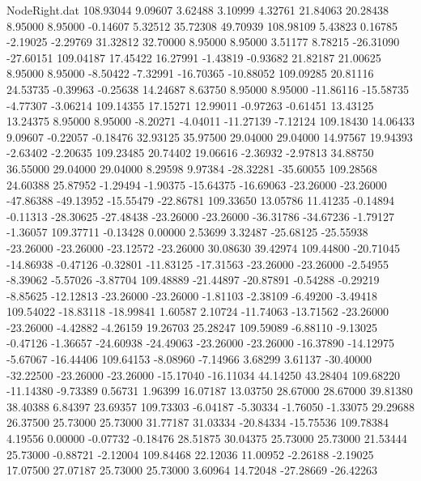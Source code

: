 \begin{filecontents}{NodeRight.dat}
 108.93044    9.09607    3.62488     3.10999    4.32761   21.84063   20.28438    8.95000    8.95000   -0.14607    5.32512   35.72308   49.70939
 108.98109    5.43823    0.16785    -2.19025   -2.29769   31.32812   32.70000    8.95000    8.95000    3.51177    8.78215  -26.31090  -27.60151
 109.04187   17.45422   16.27991    -1.43819   -0.93682   21.82187   21.00625    8.95000    8.95000   -8.50422   -7.32991  -16.70365  -10.88052
 109.09285   20.81116   24.53735    -0.39963   -0.25638   14.24687    8.63750    8.95000    8.95000  -11.86116  -15.58735   -4.77307   -3.06214
 109.14355   17.15271   12.99011    -0.97263   -0.61451   13.43125   13.24375    8.95000    8.95000   -8.20271   -4.04011  -11.27139   -7.12124
 109.18430   14.06433    9.09607    -0.22057   -0.18476   32.93125   35.97500   29.04000   29.04000   14.97567   19.94393   -2.63402   -2.20635
 109.23485   20.74402   19.06616    -2.36932   -2.97813   34.88750   36.55000   29.04000   29.04000    8.29598    9.97384  -28.32281  -35.60055
 109.28568   24.60388   25.87952    -1.29494   -1.90375  -15.64375  -16.69063  -23.26000  -23.26000  -47.86388  -49.13952  -15.55479  -22.86781
 109.33650   13.05786   11.41235    -0.14894   -0.11313  -28.30625  -27.48438  -23.26000  -23.26000  -36.31786  -34.67236   -1.79127   -1.36057
 109.37711   -0.13428    0.00000     2.53699    3.32487  -25.68125  -25.55938  -23.26000  -23.26000  -23.12572  -23.26000   30.08630   39.42974
 109.44800  -20.71045  -14.86938    -0.47126   -0.32801  -11.83125  -17.31563  -23.26000  -23.26000   -2.54955   -8.39062   -5.57026   -3.87704
 109.48889  -21.44897  -20.87891    -0.54288   -0.29219   -8.85625  -12.12813  -23.26000  -23.26000   -1.81103   -2.38109   -6.49200   -3.49418
 109.54022  -18.83118  -18.99841     1.60587    2.10724  -11.74063  -13.71562  -23.26000  -23.26000   -4.42882   -4.26159   19.26703   25.28247
 109.59089   -6.88110   -9.13025    -0.47126   -1.36657  -24.60938  -24.49063  -23.26000  -23.26000  -16.37890  -14.12975   -5.67067  -16.44406
 109.64153   -8.08960   -7.14966     3.68299    3.61137  -30.40000  -32.22500  -23.26000  -23.26000  -15.17040  -16.11034   44.14250   43.28404
 109.68220  -11.14380   -9.73389     0.56731    1.96399   16.07187   13.03750   28.67000   28.67000   39.81380   38.40388    6.84397   23.69357
 109.73303   -6.04187   -5.30334    -1.76050   -1.33075   29.29688   26.37500   25.73000   25.73000   31.77187   31.03334  -20.84334  -15.75536
 109.78384    4.19556    0.00000    -0.07732   -0.18476   28.51875   30.04375   25.73000   25.73000   21.53444   25.73000   -0.88721   -2.12004
 109.84468   22.12036   11.00952    -2.26188   -2.19025   17.07500   27.07187   25.73000   25.73000    3.60964   14.72048  -27.28669  -26.42263

\end{filecontents}
